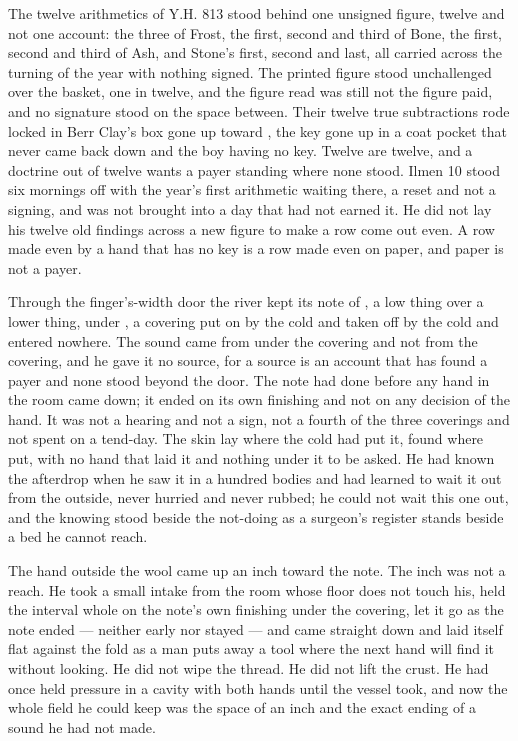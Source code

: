 \scenebreak

The twelve arithmetics of Y.H. 813 stood behind one unsigned figure, twelve and not one account: the three of Frost, the first, second and third of Bone, the first, second and third of Ash, and Stone's first, second and last, all carried across the turning of the year with nothing signed. The printed figure stood unchallenged over the basket, one in twelve, and the figure read was still not the figure paid, and no signature stood on the space between. Their twelve true subtractions rode locked in Berr Clay's box gone up  toward , the key gone up in a coat pocket that never came back down and the boy having no key. Twelve are twelve, and a doctrine out of twelve wants a payer standing where none stood. Ilmen 10 stood six mornings off with the year's first arithmetic waiting there, a reset and not a signing, and was not brought into a day that had not earned it. He did not lay his twelve old findings across a new figure to make a row come out even. A row made even by a hand that has no key is a row made even on paper, and paper is not a payer.

Through the finger's-width door the river kept its note of , a low thing over a lower thing, under , a covering put on by the cold and taken off by the cold and entered nowhere. The sound came from under the covering and not from the covering, and he gave it no source, for a source is an account that has found a payer and none stood beyond the door. The note had done before any hand in the room came down; it ended on its own finishing and not on any decision of the hand. It was not a hearing and not a sign, not a fourth of the three coverings and not spent on a tend-day. The skin lay where the cold had put it, found where put, with no hand that laid it and nothing under it to be asked. He had known the afterdrop when he saw it in a hundred bodies and had learned to wait it out from the outside, never hurried and never rubbed; he could not wait this one out, and the knowing stood beside the not-doing as a surgeon's register stands beside a bed he cannot reach.

\scenebreak

The hand outside the wool came up an inch toward the note. The inch was not a reach. He took a small intake from the room whose floor does not touch his, held the interval whole on the note's own finishing under the covering, let it go as the note ended — neither early nor stayed — and came straight down and laid itself flat against the fold as a man puts away a tool where the next hand will find it without looking. He did not wipe the thread. He did not lift the crust. He had once held pressure in a cavity with both hands until the vessel took, and now the whole field he could keep was the space of an inch and the exact ending of a sound he had not made.


